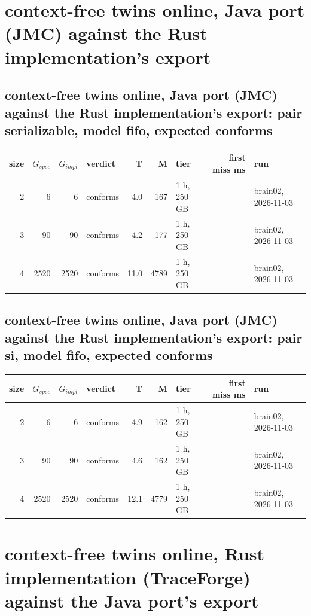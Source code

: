 \documentclass[10pt]{article}
\begin{document}
\section*{context-free twins online, Java port (JMC) against the Rust implementation's export}
\subsection*{context-free twins online, Java port (JMC) against the Rust implementation's export: pair \textsf{serializable}, model fifo, expected conforms}
\begin{longtable}{@{}rrrlrrlrl@{}}
\toprule
size & $G_{\mathit{spec}}$ & $G_{\mathit{impl}}$ & verdict & T & M & tier & first miss ms & run \\
\midrule
\endhead
\color{red} 2 & 6 & 6 & conforms & 4.0 & 167 & 1 h, 250 GB &  & brain02, 2026-11-03 \\
\color{red} 3 & 90 & 90 & conforms & 4.2 & 177 & 1 h, 250 GB &  & brain02, 2026-11-03 \\
\color{red} 4 & 2520 & 2520 & conforms & 11.0 & 4789 & 1 h, 250 GB &  & brain02, 2026-11-03 \\
\bottomrule
\end{longtable}
\subsection*{context-free twins online, Java port (JMC) against the Rust implementation's export: pair \textsf{si}, model fifo, expected conforms}
\begin{longtable}{@{}rrrlrrlrl@{}}
\toprule
size & $G_{\mathit{spec}}$ & $G_{\mathit{impl}}$ & verdict & T & M & tier & first miss ms & run \\
\midrule
\endhead
\color{red} 2 & 6 & 6 & conforms & 4.9 & 162 & 1 h, 250 GB &  & brain02, 2026-11-03 \\
\color{red} 3 & 90 & 90 & conforms & 4.6 & 162 & 1 h, 250 GB &  & brain02, 2026-11-03 \\
\color{red} 4 & 2520 & 2520 & conforms & 12.1 & 4779 & 1 h, 250 GB &  & brain02, 2026-11-03 \\
\bottomrule
\end{longtable}
\section*{context-free twins online, Rust implementation (TraceForge) against the Java port's export}
\end{document}
